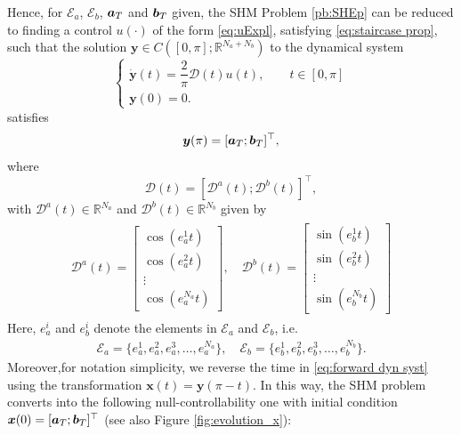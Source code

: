 \documentclass[twocolumn]{autart}    %
\begin{document}
Hence, for $\mathcal{E}_a$, $\mathcal{E}_b$, $\bm{a}_T$ and $\bm{b}_T$ given, the SHM Problem \ref{pb:SHEp} can be reduced to finding a control $u(\cdot)$ of the form \eqref{eq:uExpl}, satisfying \eqref{eq:staircase prop}, such that the solution $\bm{y} \in C([0,\pi]; \mathbb{R}^{N_a+N_b})$ to the dynamical system
\begin{equation}\label{eq:forward dyn syst}
	\begin{cases}
		\dot{\bm{y}}(t) = \dfrac{2}{\pi} \bm{\mathcal{D}}(t) u(t), \qquad  t\in [0,\pi]
		\\[5pt]
		\bm{y}(0) = 0.
	\end{cases}
\end{equation}
satisfies
\begin{align*}
	\bm{y} (\pi) = [\bm{a}_T;\bm{b}_T]^\top,	
\end{align*}
where
\begin{equation}\label{eq:Dynamics}
	\bm{\mathcal{D}}(t) = \left[ \bm{\mathcal{D}}^a(t); \bm{\mathcal{D}}^b(t) \right]^\top, 
\end{equation}
with $\bm{\mathcal{D}}^a(t) \in \mathbb{R}^{N_a} $ and $ \bm{\mathcal{D}}^b(t) \in \mathbb{R}^{N_b}$ given by
\begin{gather}\label{eq:DalphaDbeta}
    \begin{align}
        \bm{\mathcal{D}}^a(t) = 
        \begin{bmatrix} 
            \cos(e_a^1t) \\ \cos(e_a^2t) \\ \vdots \\ \cos(e_a^{N_a}t) 
        \end{bmatrix},
        \quad \bm{\mathcal{D}}^b(t) = 
        \begin{bmatrix} 
            \sin(e_b^1t) \\ \sin(e_b^2t) \\ \vdots \\ \sin(e_b^{N_b}t)
        \end{bmatrix} 
    \end{align} 
\end{gather}
Here, $e_a^i$ and $e_b^i$  denote the elements in $\mathcal{E}_a$ and  $\mathcal{E}_b$, i.e.
\begin{align*}
	\mathcal{E}_a = \{e_a^1,e_a^2,e_a^3,\dots,e_a^{N_a}\}, \quad \mathcal{E}_b = \{e_b^1,e_b^2,e_b^3,\dots,e_b^{N_b}\}.
\end{align*}
Moreover,for notation simplicity, we reverse the time in \eqref{eq:forward dyn syst} using the transformation $\bm{x} (t) = \bm{y}(\pi - t)$. In this way, the SHM problem converts into the following null-controllability one with initial condition $\bm{x}(0) = [\bm{a}_T; \bm{b}_T]^\top$ (see also Figure \ref{fig:evolution_x}):
\end{document}
